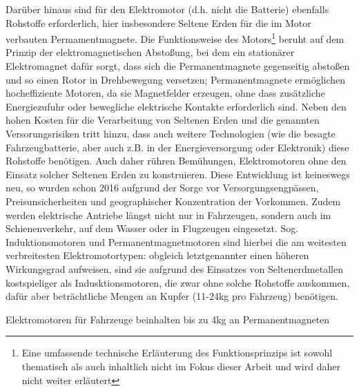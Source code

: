 \documentclass[12pt,a4paper,oneside]{book} %
\begin{document}
{{Darüber hinaus sind für den Elektromotor (d.h. nicht die Batterie) ebenfalls Rohstoffe erforderlich, hier insbesondere Seltene Erden für die im Motor verbauten Permamentmagnete. Die Funktionsweise des Motors\footnote{Eine umfassende technische Erläuterung des Funktionsprinzips ist sowohl thematisch als auch inhaltlich nicht im Fokus dieser Arbeit und wird daher nicht weiter erläutert} beruht auf dem Prinzip der elektromagnetischen Abstoßung, bei dem ein stationärer Elektromagnet dafür sorgt, dass sich die Permanentmagnete gegenseitig abstoßen und so einen Rotor in Drehbewegung versetzen; Permanentmagnete ermöglichen hocheffiziente Motoren, da sie Magnetfelder erzeugen, ohne dass zusätzliche Energiezufuhr oder bewegliche elektrische Kontakte erforderlich sind.\autocite{Emerging magnetic materials for electric vehicle drive motors, Christopher L. Rom} Neben den hohen Kosten für die Verarbeitung von Seltenen Erden und die genannten Versorungsrisiken tritt hinzu, dass auch weitere Technologien (wie die besagte Fahrzeugbatterie, aber auch z.B. in der Energieversorgung oder Elektronik) diese Rohstoffe benötigen. Auch daher rühren Bemühungen, Elektromotoren ohne den Einsatz solcher Seltenen Erden zu konstruieren. Diese Entwicklung ist keineswegs neu, so wurden schon 2016 aufgrund der Sorge vor Versorgungsengpässen, Preisunsicherheiten und geographischer Konzentration der Vorkommen.\autocite{Rare-earth-free propulsion motors for electric vehicles: A technology review, Jordi-Roger Riba, Renewable and Sustainable Energy Reviews, 57, 376-379, 2016} Zudem werden elektrische Antriebe längst nicht nur in Fahrzeugen, sondern auch im Schienenverkehr, auf dem Wasser oder in Flugzeugen eingesetzt. Sog. Induktionsmotoren und Permanentmagnetmotoren sind hierbei die am weitesten verbreitesten Elektromotortypen: obgleich letztgenannter einen höheren Wirkungsgrad aufweisen, sind sie aufgrund des Einsatzes von Seltenerdmetallen kostspieliger als Indusktionsmotoren, die zwar ohne solche Rohstoffe auskommen, dafür aber beträchtliche Mengen an Kupfer (11-24kg pro Fahrzeug) benötigen.\autocite{Nagy, Will the EU have enough minerals to drive their electric dreams by 2030?, S. 2}


Elektromotoren für Fahrzeuge beinhalten bis zu 4kg an Permanentmagneten

}}
\end{document}
